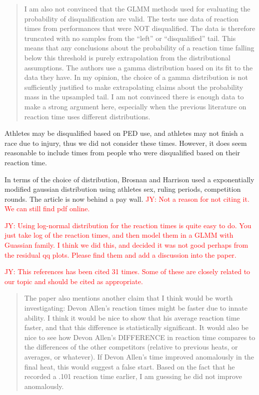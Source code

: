 \documentclass[12pt]{article}
\newcommand{\jy}[1]{\textcolor{red}{JY: #1}}
\newenvironment{comment}%
{\begin{quotation}\noindent\small\it\color{darkblue}\ignorespaces%
}{\end{quotation}}
\begin{document}
\begin{comment}
I am also not convinced that the GLMM methods used for evaluating the
probability of disqualification are valid. The tests use data of reaction times
from performances that were NOT disqualified.  The data is therefore truncated
with no samples from the “left” or “disqualified” tail. This means that any
conclusions about the probability of a reaction time falling below this
threshold is purely extrapolation from the distributional assumptions. The
authors use a gamma distribution based on its fit to the data they have. In my
opinion, the choice of a gamma distribution is not sufficiently justified to
make extrapolating claims about the probability mass in the upsampled tail. I am
not convinced there is enough data to make a strong argument here, especially
when the previous literature on reaction time uses different distributions.
\end{comment}
Athletes may be disqualified based on PED use, and athletes may not finish a race
due to injury, thus we did not consider these times.  However, it does seem
reasonable to include times from people who were disqualified based on their
reaction time.

In terms of the choice of distribution, Brosnan and Harrison used a exponentially
modified gaussian distribution using athletes sex, ruling periods, competition
rounds. The article is now behind a pay wall.
\jy{Not a reason for not citing it. We can still find pdf online.}

\jy{Using log-normal distribution for the reaction times is quite easy
  to do. You just take log of the reaction times, and then model them
  in a GLMM with Guassian family. I think we did this, and decided it
  was not good perhaps from the residual qq plots. Please find them
  and add a discussion into the paper.}

\jy{This references has been cited 31 times. Some of these are closely
  related to our topic and should be cited as appropriate.}

\begin{comment}
The paper also mentions another claim that I think would be worth investigating:
Devon Allen’s reaction times might be faster due to innate ability. I think it
would be nice to show that his average reaction time faster, and that this
difference is statistically significant. It would also be nice to see how Devon
Allen’s DIFFERENCE in reaction time compares to the differences of the other
competitors (relative to previous heats, or averages, or whatever). If Devon
Allen’s time improved anomalously in the final heat, this would suggest a false
start. Based on the fact that he recorded a .101 reaction time earlier, I am
guessing he did not improve anomalously.  
\end{comment}
\end{document}

